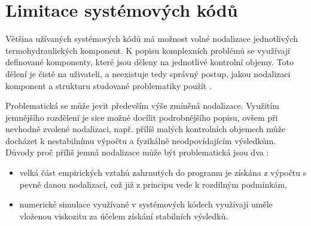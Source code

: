 %




\section{Limitace systémových kódů}
Většina užívaných systémových kódů má možnost volné nodalizace jednotlivých termohydraulických komponent. K popisu komplexních problémů se využívají definované komponenty, které jsou děleny na jednotlivé kontrolní objemy. Toto dělení je čistě na uživateli, a neexistuje tedy správný postup, jakou nodalizaci komponent a strukturu studované problematiky použít \cite{petruzzi2008thermal}.

Problematická se může jevit především výše zmíněná nodalizace. Využitím jemnějšího rozdělení je sice možné docílit podrobnějšího popisu, ovšem při nevhodně zvolené nodalizaci, např. přílíš malých kontrolních objemech může docházet k nestabilnímu výpočtu a fyzikálně neodpovídajícím výsledkům. Důvody proč příliš jemná nodalizace může být problematická jsou dva \cite{petruzzi2008thermal}:
\begin{itemize}
	\item velká část empirických vztahů zahrnutých do programu je získána z výpočtu s pevně danou nodalizací, což již z principu vede k rozdílným podmínkám,
	\item numerické simulace využívané v systémových kódech využívají uměle vloženou viskozitu za účelem získání stabilních výsledků.
\end{itemize}


